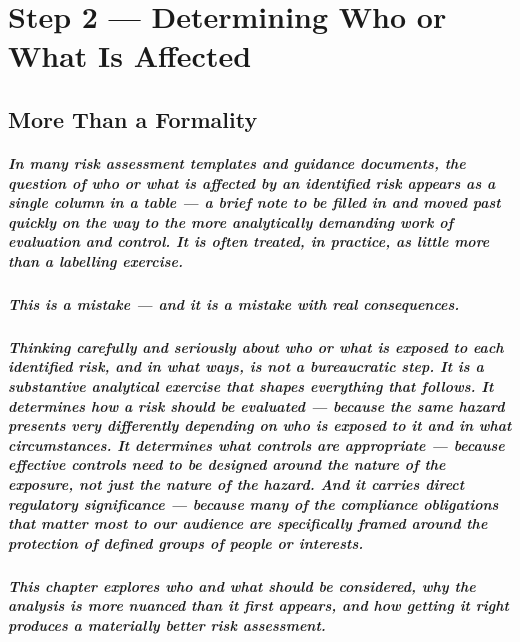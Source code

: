\chapter{Step 2 — Determining Who or What Is Affected}
\label{chap:Step 2 — Determining Who or What Is Affected}

\section{More Than a Formality}
\paragraph{In many risk assessment templates and guidance documents, the question of who or what is affected by an identified risk appears as a single column in a table — a brief note to be filled in and moved past quickly on the way to the more analytically demanding work of evaluation and control. It is often treated, in practice, as little more than a labelling exercise.}
\paragraph{\textbf{This is a mistake — and it is a mistake with real consequences}.}
\paragraph{Thinking carefully and seriously about who or what is exposed to each identified risk, and in what ways, is not a bureaucratic step. It is a substantive analytical exercise that shapes everything that follows. It determines how a risk should be evaluated — because the same hazard presents very differently depending on who is exposed to it and in what circumstances. It determines what controls are appropriate — because effective controls need to be designed around the nature of the exposure, not just the nature of the hazard. And it carries direct regulatory significance — because many of the compliance obligations that matter most to our audience are specifically framed around the protection of defined groups of people or interests.}
\paragraph{This chapter explores who and what should be considered, why the analysis is more nuanced than it first appears, and how getting it right produces a materially better risk assessment.}

